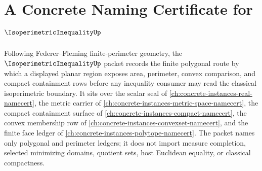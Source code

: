 \chapter{A Concrete Naming Certificate for $\IsoperimetricInequalityUp$}
\label{ch:concrete-instances-isoperimetric-inequality-namecert}

Following Federer--Fleming finite-perimeter geometry, the $\IsoperimetricInequalityUp$ packet records the finite polygonal route by which a displayed planar region exposes area, perimeter, convex comparison, and compact containment rows before any inequality consumer may read the classical isoperimetric boundary. It sits over the scalar seal of \autoref{ch:concrete-instances-real-namecert}, the metric carrier of \autoref{ch:concrete-instances-metric-space-namecert}, the compact containment surface of \autoref{ch:concrete-instances-compact-namecert}, the convex membership row of \autoref{ch:concrete-instances-convexset-namecert}, and the finite face ledger of \autoref{ch:concrete-instances-polytope-namecert}. The packet names only polygonal and perimeter ledgers; it does not import measure completion, selected minimizing domains, quotient sets, host Euclidean equality, or classical compactness.

